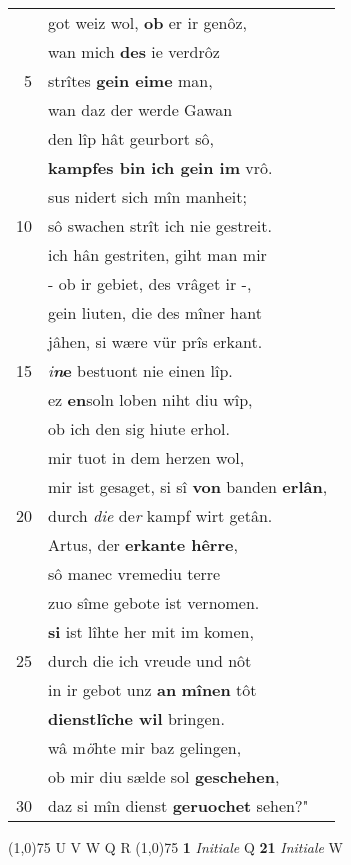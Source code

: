 \documentclass[8pt,a4paper,notitlepage]{article}
\begin{document}
\begin{table}[ht]
\begin{minipage}[t]{0.5\linewidth}
\begin{tabular}{rl}
 & got weiz wol, \textbf{ob} er ir genôz,\\ 
 & wan mich \textbf{des} ie verdrôz\\ 
5 & strîtes \textbf{gein eime} man,\\ 
 & wan daz der werde Gawan\\ 
 & den lîp hât geurbort sô,\\ 
 & \textbf{kampfes bin ich gein im} vrô.\\ 
 & sus nidert sich mîn manheit;\\ 
10 & sô swachen strît ich nie gestreit.\\ 
 & ich hân gestriten, giht man mir\\ 
 & - ob ir gebiet, des vrâget ir -,\\ 
 & gein liuten, die des mîner hant\\ 
 & jâhen, si wære vür prîs erkant.\\ 
15 & \textit{i}\textbf{\textit{n}e} bestuont nie einen lîp.\\ 
 & ez \textbf{en}soln loben niht diu wîp,\\ 
 & ob ich den sig hiute erhol.\\ 
 & mir tuot in dem herzen wol,\\ 
 & mir ist gesaget, si sî \textbf{von} banden \textbf{erlân},\\ 
20 & durch \textit{die} de\textit{r} kampf wirt getân.\\ 
 & Artus, der \textbf{erkante hêrre},\\ 
 & sô manec vremediu terre\\ 
 & zuo sîme gebote ist vernomen.\\ 
 & \textbf{si} ist lîhte her mit im komen,\\ 
25 & durch die ich vreude und nôt\\ 
 & in ir gebot unz \textbf{an} \textbf{mînen} tôt\\ 
 & \textbf{dienstlîche wil} bringen.\\ 
 & wâ m\textit{ö}hte mir baz gelingen,\\ 
 & ob mir diu sælde sol \textbf{geschehen},\\ 
30 & daz si mîn dienst \textbf{geruochet} sehen?"\\ 
\end{tabular}
\scriptsize
\line(1,0){75} \newline
U V W Q R \newline
\line(1,0){75} \newline
\textbf{1} \textit{Initiale} Q  \textbf{21} \textit{Initiale} W  \newline

\end{minipage}
\end{table}
\end{document}
